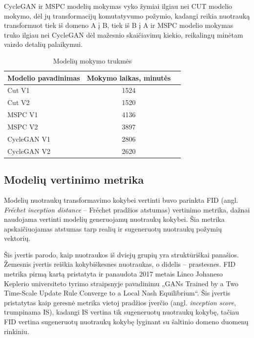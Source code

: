 \documentclass{VUMIFPSkursinis}
\begin{document}
            CycleGAN ir MSPC modelių mokymas vyko žymiai ilgiau nei CUT modelio mokymo, dėl jų transformacijų komutatyvumo požymio, kadangi reikia nuotrauką transformuot tiek iš domeno A į B, tiek iš B į A ir MSPC modelio mokymas truko ilgiau nei CycleGAN dėl mažesnio skaičiavimų kiekio, reikalingų minėtam vaizdo detalių palaikymui.
            \begin{table}[H]\footnotesize
              \centering
              \caption{Modelių mokymo trukmės}
              {\begin{tabular}{|l|c|c|} \hline
                Modelio pavadinimas & Mokymo laikas, minutės\\
                \hline
                Cut V1 & 1524 \\
                Cut V2 & 1520 \\ 
                MSPC V1 & 4136 \\
                MSPC V2 & 3897 \\
                CycleGAN V1 & 2806 \\
                CycleGAN V2 & 2620 \\
                \hline
              \end{tabular}}
              \label{tab:table example}
            \end{table}

        \subsection{Modelių vertinimo metrika}
            Modelių nuotraukų transformavimo kokybei vertinti buvo parinkta FID (angl. \emph{Fréchet inception distance} – Fréchet pradžios atstumas) vertinimo metrika, dažnai naudojama vertinti modelių generuojamų nuotraukų kokybei. Šia metrika apskaičiuojamas atstumas tarp realių ir sugeneruotų nuotraukų požymių vektorių.

            Šis įvertis parodo, kaip nuotraukos iš dviejų grupių yra struktūriškai panašios. Žemesnis įvertis reiškia kokybiškesnes nuotraukas, o didelis – prastesnes. FID metrika pirmą kartą pristatyta ir panaudota 2017 metais Linco Johaneso Keplerio universiteto tyrimo straipsnyje pavadinimu „GANs Trained by a Two Time-Scale Update Rule Converge to a Local Nash Equilibrium“\cite{FidStart}. Šis įvertis pristatytas kaip geresnė metrika vietoj pradžios įverčio (angl. \emph{inception score}, trumpinama IS), kadangi IS vertina tik sugeneruotų nuotraukų kokybę, tačiau FID vertina sugeneruotų nuotraukų kokybę lyginant su šaltinio domeno duomenų rinkiniu.
            
\end{document}
